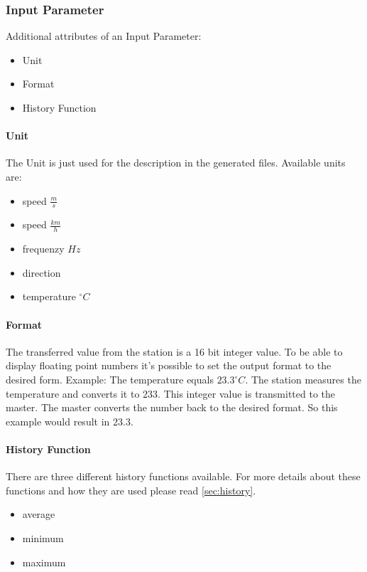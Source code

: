 \subsubsection{Input Parameter} %
\label{ssub:input_parameter}
Additional attributes of an Input Parameter:
\begin{itemize}
	\item Unit
	\item Format
	\item History Function
\end{itemize}

\paragraph{Unit} %
\label{par:unit}
The Unit is just used for the description in the generated files. Available units are:
\begin{itemize}
	\item speed $\frac{m}{s}$
	\item speed $\frac{km}{h}$
	\item frequenzy $Hz$
	\item direction
	\item temperature $^\circ C$
\end{itemize}


\paragraph{Format} %
\label{par:format}
The transferred value from the station is a 16 bit integer value. To be able to display floating point numbers it's possible to set the output format to the desired form. Example: The temperature equals $23.3 ^\circ C$. The station measures the temperature and converts it to $233$. This integer value is transmitted to the master. The master converts the number back to the desired format. So this example would result in $23.3$.

\paragraph{History Function} %
\label{par:histfunc}
There are three different history functions available. For more details about these functions and how they are used please read \ref{sec:history}.
\label{par:history_function}
\begin{itemize}
    \item average
    \item minimum
    \item maximum
\end{itemize}


